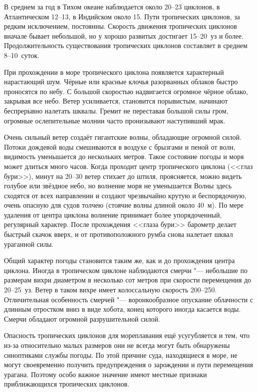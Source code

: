 В среднем за год в Тихом океане наблюдается около 20--23 циклонов, в
Атлантическом 12--13, в Индийском около 15. Пути тропических циклонов,
за редким исключением, постоянны. Скорость движения тропических
циклонов вначале бывает небольшой, но у хорошо развитых достигает
15--20~уз и более. Продолжительность существования тропических циклонов
составляет в среднем 8--10~суток.

При прохождении в море тропического циклона появляется характерный
нарастающий шум. Чёрные или красные клочья разорванных облаков быстро
проносятся по небу. С большой скоростью надвигается огромное чёрное
облако, закрывая все небо. Ветер усиливается, становится порывистым,
начинают беспрерывно налетать шквалы. Гремит не переставая большой
силы гром, огромные ослепительные молнии часто пронизывают наступивший
мрак.

Очень сильный ветер создаёт гигантские волны, обладающие огромной
силой. Потоки дождевой воды смешиваются в воздухе с брызгами и пеной
от волн, видимость уменьшается до нескольких метров. Такое состояние
погоды и моря может длиться много часов. Когда проходит центр
тропического циклона (<<глаз бури>>), минут на 20--30 ветер стихает до
штиля, проясняется, можно видеть голубое или звёздное небо, но
волнение моря не уменьшается Волны здесь сходятся от всех направлении
и создают чрезвычайно крутую и беспорядочную, очень опасную для судов
толчею (стоячие волны длиной около 40~м). По мере удаления от центра
циклона волнение принимает более упорядоченный, регулярный
характер. После прохождения <<глаза бури>> барометр делает быстрый
скачок вверх, и от противоположного румба снова налетает шквал
ураганной силы.

Общий характер погоды становится таким же, как и до прохождения центра
циклона. Иногда в тропическом циклоне наблюдаются смерчи "--- небольшие
по размерам вихри диаметром в несколько сот метров при скорости
перемещения до 20--25~уз. Ветер в таком вихре имеет колоссальную
скорость 200--250\speedms. Отличительная особенность смерчей "---
воронкообразное опускание облачности с длинным отростком вниз в виде
хобота, конец которого иногда касается воды. Смерчи обладают огромной
разрушительной силой.

Опасность тропических циклонов для мореплавания ещё усугубляется и
тем, что из-за относительно малых размеров они не всегда могут быть
обнаружены синоптиками службы погоды. По этой причине суда,
находящиеся в море, не могут своевременно получить предупреждения о
зарождении и пути перемещения урагана. Поэтому особо важное значение
имеют местные признаки приближающихся тропических циклонов.

